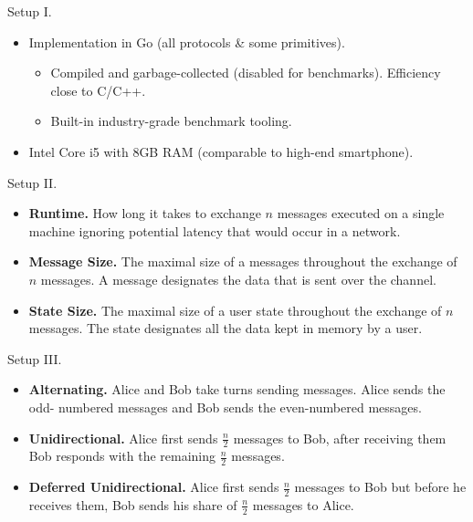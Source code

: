 \documentclass{beamer}
\begin{document}
\begin{frame}{Setup I.}
  \begin{itemize}
  \item Implementation in Go (all protocols \& some primitives).
    \begin{itemize}
    \item Compiled and garbage-collected (disabled for benchmarks).
      Efficiency close to C/C++.
    \item Built-in industry-grade benchmark tooling.
    \end{itemize}
  \item Intel Core i5 with 8GB RAM (comparable to high-end smartphone).
  \end{itemize}
\end{frame}

\begin{frame}{Setup II.}
  \begin{itemize}
  \item \textbf{Runtime.} How long it takes to exchange $n$ messages
    executed on a single machine ignoring potential latency that would occur in a network.
  \item \textbf{Message Size.} The maximal size of a messages throughout the
    exchange of $n$ messages. A message designates the data that is sent over the channel.
  \item \textbf{State Size.} The maximal size of a user state throughout the
    exchange of $n$ messages. The state designates all the data kept in memory by a user.
  \end{itemize}
\end{frame}

\begin{frame}{Setup III.}
  \begin{itemize}
  \item \textbf{Alternating.} Alice and Bob take turns sending messages.
    Alice sends the odd- numbered messages and Bob sends the even-numbered messages.
  \item \textbf{Unidirectional.} Alice first sends $\frac{n}{2}$ messages to Bob,
    after receiving them Bob responds with the remaining $\frac{n}{2}$ messages.
  \item \textbf{Deferred Unidirectional.} Alice first sends $\frac{n}{2}$ messages
    to Bob but before he receives them, Bob sends his share of $\frac{n}{2}$ messages to Alice.
  \end{itemize}
\end{frame}
\end{document}
